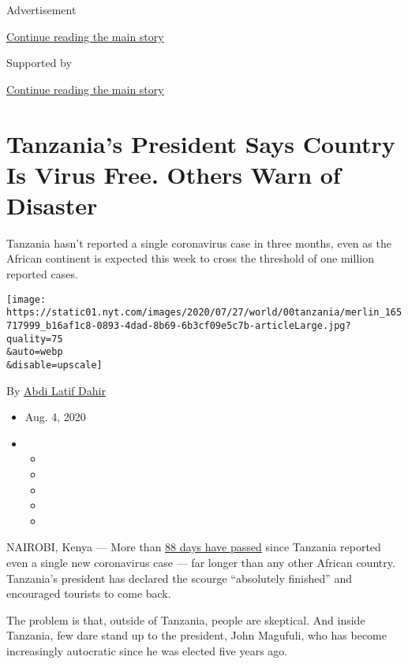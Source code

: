 Advertisement

\protect\hyperlink{after-top}{Continue reading the main story}

Supported by

\protect\hyperlink{after-sponsor}{Continue reading the main story}

\hypertarget{tanzanias-president-says-country-is-virus-free-others-warn-of-disaster}{%
\section{Tanzania's President Says Country Is Virus Free. Others Warn of
Disaster}\label{tanzanias-president-says-country-is-virus-free-others-warn-of-disaster}}

Tanzania hasn't reported a single coronavirus case in three months, even
as the African continent is expected this week to cross the threshold of
one million reported cases.

\texttt{[image: https://static01.nyt.com/images/2020/07/27/world/00tanzania/merlin\_165717999\_b16af1c8-0893-4dad-8b69-6b3cf09e5c7b-articleLarge.jpg?quality=75\\\&auto=webp\\\&disable=upscale]}

By \href{https://www.nytimes.com/by/abdi-latif-dahir}{Abdi Latif Dahir}

\begin{itemize}
\item
  Aug. 4, 2020
\item
  \begin{itemize}
  \item
  \item
  \item
  \item
  \item
  \end{itemize}
\end{itemize}

NAIROBI, Kenya --- More than
\href{https://www.who.int/docs/default-source/coronaviruse/situation-reports/20200804-covid-19-sitrep-197.pdf?sfvrsn=94f7a01d_2}{88
days have passed} since Tanzania reported even a single new coronavirus
case --- far longer than any other African country. Tanzania's president
has declared the scourge ``absolutely finished'' and encouraged tourists
to come back.

The problem is that, outside of Tanzania, people are skeptical. And
inside Tanzania, few dare stand up to the president, John Magufuli, who
has become increasingly autocratic since he was elected five years ago.

